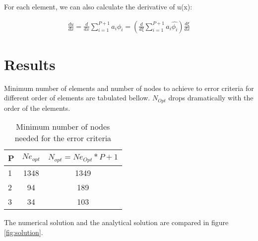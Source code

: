 \documentclass[paper=a4, fontsize=11pt]{article} %
\begin{document}
For each element, we can also calculate the derivative of u(x):

\begin{eqnarray}
\frac{du}{dx} = \frac{d}{dx} \sum_{i=1}^{P+1} a_i \phi_i = (\frac{d}{d\xi}\sum_{i=1}^{P+1} a_i \hat{\phi_i})\frac{d\xi}{dx}
\end{eqnarray}

\section{Results}

Minimum number of elements and number of nodes to achieve to error criteria for different order of elements are tabulated bellow. $N_{Opt}$ drops dramatically with the order of the elements. 
\begin{table}
\begin{center}
  \begin{tabular}{ l | c | c}
    \hline
    P & $Ne_{opt}$ & $N_{opt} = Ne_{Opt} * P + 1 $\\ \hline
    1 & 1348 & 1349\\ \hline
    2 &  94 & 189\\ \hline
    3 & 34 & 103\\ \hline
    \hline
  \end{tabular}
  \caption{Minimum number of nodes needed for the error criteria}
\end{center}
\end{table}

The numerical solution and the analytical solution are compared in figure \ref{fig:solution}. 


        
        
\end{document}
